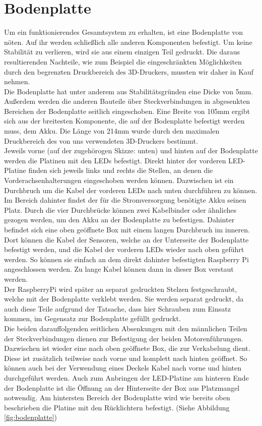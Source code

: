 \section{Bodenplatte}
Um ein funktionierendes Gesamtsystem zu erhalten, ist eine Bodenplatte von nöten. Auf ihr werden schließlich alle anderen Komponenten befestigt. Um keine Stabilität zu verlieren, wird sie aus einem einzigen Teil gedruckt. Die daraus resultierenden Nachteile, wie zum Beispiel die eingeschränkten Möglichkeiten durch den begrenzten Druckbereich des 3D-Druckers, mussten wir daher in Kauf nehmen.\\
Die Bodenplatte hat unter anderem aus Stabilitätsgründen eine Dicke von 5mm. Außerdem werden die anderen Bauteile über Steckverbindungen in abgesenkten Bereichen der Bodenplatte seitlich eingeschoben. Eine Breite von 105mm ergibt sich aus der breitesten Komponente, die auf der Bodenplatte befestigt werden muss, dem Akku. Die Länge von 214mm wurde durch den maximalen Druckbereich des von uns verwendeten 3D-Druckers bestimmt.\\
Jeweils vorne (auf der zugehörogen Skizze: unten) und hinten auf der Bodenplatte werden die Platinen mit den LEDs befestigt. Direkt hinter der vorderen LED-Platine finden sich jeweils links und rechts die Stellen, an denen die Vorderachsenhalterungen eingeschoben werden können. Dazwischen ist ein Durchbruch um die Kabel der vorderen LEDs nach unten durchführen zu können.\\ 
Im Bereich dahinter findet der für die Stromversorgung benötigte Akku seinen Platz. Durch die vier Durchbrücke können zwei Kabelbinder oder ähnliches gezogen werden, um den Akku an der Bodenplatte zu befestigen. Dahinter befindet sich eine oben geöffnete Box mit einem langen Durchbruch im inneren. Dort können die Kabel der Sensoren, welche an der Unterseite der Bodenplatte befestigt werden, und die Kabel der vorderen LEDs wieder nach oben geführt werden. So können sie einfach an dem direkt dahinter befestigten Raspberry Pi angeschlossen werden. Zu lange Kabel können dann in dieser Box verstaut werden.\\
Der RaspberryPi wird später an separat gedruckten Stelzen festgeschraubt, welche mit der Bodenplatte verklebt werden. Sie werden separat gedruckt, da auch diese Teile aufgrund der Tatsache, dass hier Schrauben zum Einsatz kommen, im Gegensatz zur Bodenplatte gefüllt gedruckt.\\
Die beiden darauffolgenden seitlichen Absenkungen mit den männlichen Teilen der Steckverbindungen dienen zur Befestigung der beiden Motorenführungen. Dazwischen ist wieder eine nach oben geöffnete Box, die zur Verkabelung dient. Diese ist zusätzlich teilweise nach vorne und komplett nach hinten geöffnet. So können auch bei der Verwendung eines Deckels Kabel nach vorne und hinten durchgeführt werden. Auch zum Anbringen der LED-Platine am hinteren Ende der Bodenplatte ist die Öffnung an der Hinterseite der Box aus Platzmangel notwendig. Am hintersten Bereich der Bodenplatte wird wie bereits oben beschrieben die Platine mit den Rücklichtern befestigt. (Siehe Abbildung \ref{fig:bodenplatte})
